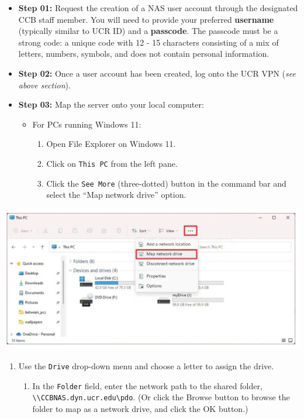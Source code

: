 \documentclass[
]{book}
\providecommand{\tightlist}{%
  \setlength{\itemsep}{0pt}\setlength{\parskip}{0pt}}
\begin{document}
\begin{itemize}
\item
  \textbf{Step 01:} Request the creation of a NAS user account through the designated CCB staff member. You will need to provide your preferred \textbf{username} (typically similar to UCR ID) and a \textbf{passcode}. The passcode must be a strong code: a unique code with 12 - 15 characters consisting of a mix of letters, numbers, symbols, and does not contain personal information.
\item
  \textbf{Step 02:} Once a user account has been created, log onto the UCR VPN (\emph{see above section}).
\item
  \textbf{Step 03:} Map the server onto your local computer:

  \begin{itemize}
  \tightlist
  \item
    For PCs running Windows 11:

    \begin{enumerate}
    \def\labelenumi{\arabic{enumi}.}
    \tightlist
    \item
      Open File Explorer on Windows 11.
    \item
      Click on \texttt{This\ PC} from the left pane.
    \item
      Click the \texttt{See\ More} (three-dotted) button in the command bar and select the ``Map network drive'' option.
    \end{enumerate}
  \end{itemize}
\end{itemize}

\begin{flushleft}\includegraphics[width=0.8\linewidth]{images/nas_map} \end{flushleft}

\begin{enumerate}
\def\labelenumi{\arabic{enumi}.}
\setcounter{enumi}{3}
\tightlist
\item
  Use the \texttt{Drive} drop-down menu and choose a letter to assign the drive.

  \begin{enumerate}
  \def\labelenumii{\arabic{enumii}.}
  \setcounter{enumii}{4}
  \tightlist
  \item
    In the \texttt{Folder} field, enter the network path to the shared folder, \texttt{\textbackslash{}\textbackslash{}CCBNAS.dyn.ucr.edu\textbackslash{}pdo}. (Or click the Browse button to browse the folder to map as a network drive, and click the OK button.)
  \end{enumerate}
\end{enumerate}
\end{document}

